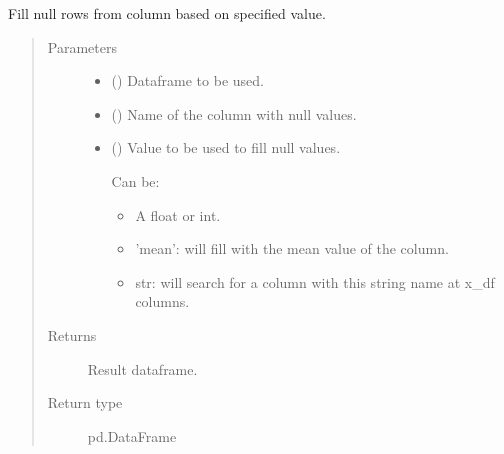 \documentclass[letterpaper,10pt,english]{sphinxmanual}
\begin{document}
\begin{fulllineitems}
\label{\detokenize{source/optimization.datatools:optimization.datatools.dataprep.fill_na}}
Fill null rows from column based on specified value.
\begin{quote}\begin{description}
\item[{Parameters}] \leavevmode\begin{itemize}
\item {} 
 () \textendash{} Dataframe to be used.

\item {} 
 () \textendash{} Name of the column with null values.

\item {} 
 () \textendash{} 
Value to be used to fill null values.

Can be:
\begin{itemize}
\item {} 
A float or int.

\item {} 
’mean’: will fill with the mean value of the column.

\item {} 
str: will search for a column with this string name at x\_df columns.

\end{itemize}


\end{itemize}

\item[{Returns}] \leavevmode
{} \textendash{} Result dataframe.

\item[{Return type}] \leavevmode
pd.DataFrame

\end{description}\end{quote}

\end{fulllineitems}
\end{document}
